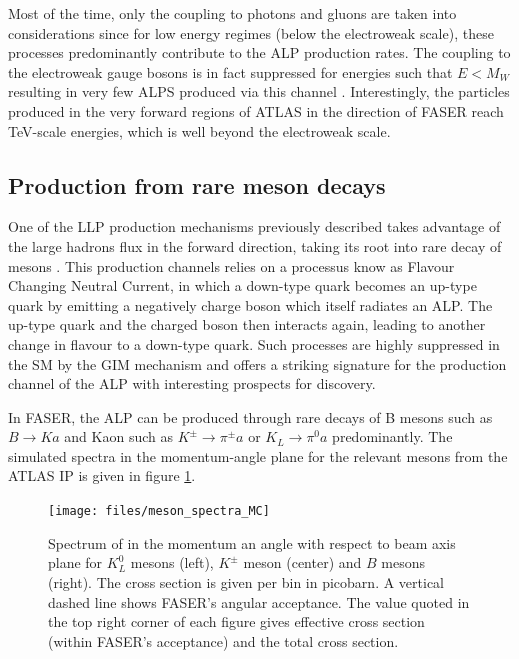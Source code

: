 		Most of the time, only the coupling to photons and gluons are taken into considerations since for low energy regimes (below the electroweak scale), these processes predominantly contribute to the ALP production rates. The coupling to the electroweak gauge bosons is in fact suppressed for energies such that $E < M_{W}$ resulting in very few ALPS produced via this channel \cite{ALPs_general}. Interestingly, the particles produced in the very forward regions of ATLAS in the direction of FASER reach TeV-scale energies, which is well beyond the electroweak scale.    
		
		\subsection{Production from rare meson decays}
		One of the LLP production mechanisms previously described takes advantage of the large hadrons flux in the forward direction, taking its root into rare decay of mesons . This production channels relies on a processus know as Flavour Changing Neutral Current, in which a down-type quark becomes an up-type quark by emitting a negatively charge boson which itself radiates an ALP. The up-type quark and the charged boson then interacts again, leading to another change in flavour to a down-type quark. Such processes are highly suppressed in the SM by the GIM mechanism \cite{GIM_mechanism} and offers a striking signature for the production channel of the ALP with interesting prospects for discovery. 
		
		In FASER, the ALP can be produced through rare decays of B mesons such as $B \rightarrow K a$ and Kaon such as $K^\pm \rightarrow \pi^\pm a$ or $K_L \rightarrow \pi^0 a$ predominantly. The simulated spectra in the momentum-angle plane for the relevant mesons from the ATLAS IP is given in figure \ref{im:meson_spectra_MC}.
		\begin{figure}[h]
			\centering
			\texttt{[image: files/meson\_spectra\_MC]}
			\caption{Spectrum of in the momentum an angle with respect to beam axis plane for $K_L^0$ mesons (left), $K^\pm$ meson (center) and $B$ mesons (right). The cross section is given per bin in picobarn. A vertical dashed line shows FASER's angular acceptance. The value quoted in the top right corner of each figure gives effective cross section (within FASER's acceptance) and the total cross section.}
			\label{im:meson_spectra_MC}
		\end{figure}
		
